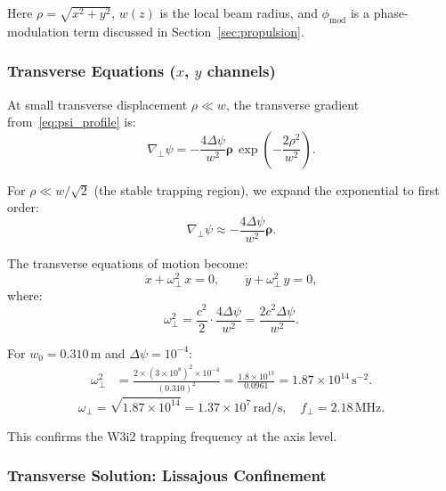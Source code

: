 \documentclass[aps,prd,twocolumn,superscriptaddress]{revtex4-2}
\begin{document}
Here $\rho = \sqrt{x^2+y^2}$, $w(z)$ is the local beam radius, and
$\phi_\mathrm{mod}$ is a phase-modulation term discussed in
Section~\ref{sec:propulsion}.

\subsubsection{Transverse Equations ($x$, $y$ channels)}

At small transverse displacement $\rho \ll w$, the transverse
gradient from~\eqref{eq:psi_profile} is:
\begin{equation}
\nabla_\perp\psi = -\frac{4\Delta\psi}{w^2}\bm{\rho}\,
\exp\!\left(-\frac{2\rho^2}{w^2}\right).
\end{equation}

For $\rho \ll w/\sqrt{2}$ (the stable trapping region), we expand
the exponential to first order:
\begin{equation}
\nabla_\perp\psi \approx -\frac{4\Delta\psi}{w^2}\bm{\rho}.
\label{eq:grad_linear}
\end{equation}

The transverse equations of motion become:
\begin{equation}
\boxed{
\ddot{x} + \omega_\perp^2\,x = 0,
\qquad
\ddot{y} + \omega_\perp^2\,y = 0,
}
\label{eq:trans_osc}
\end{equation}
where:
\begin{equation}
\omega_\perp^2 = \frac{c^2}{2}\cdot\frac{4\Delta\psi}{w^2}
= \frac{2c^2\Delta\psi}{w^2}.
\label{eq:omega_perp_def}
\end{equation}

For $w_0 = 0.310$\,m and $\Delta\psi = 10^{-4}$:
\begin{align}
\omega_\perp^2 &= \frac{2\times(3\times10^8)^2\times10^{-4}}{(0.310)^2}
= \frac{1.8\times10^{13}}{0.0961}
= 1.87\times10^{14}\,\mathrm{s}^{-2}.
\label{eq:omega_perp_num}
\end{align}
\begin{equation}
\omega_\perp = \sqrt{1.87\times10^{14}} = 1.37\times10^7\,\mathrm{rad/s},
\quad f_\perp = 2.18\,\mathrm{MHz}.
\label{eq:f_perp}
\end{equation}

This confirms the W3i2 trapping frequency at the axis level.

\subsubsection{Transverse Solution: Lissajous Confinement}
\end{document}
